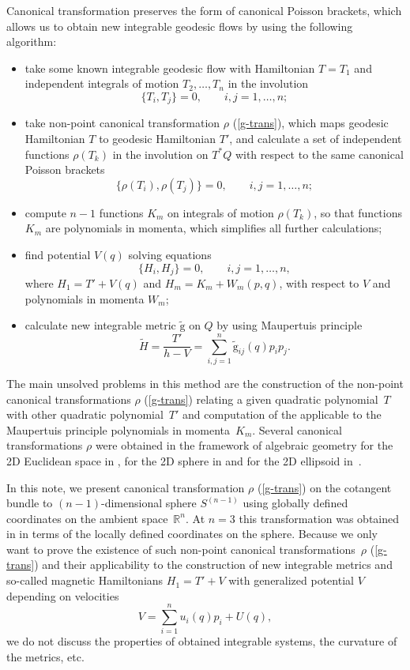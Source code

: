\documentclass[pdftex]{sigma}
\numberwithin{equation}{section}
\begin{document}
Canonical transformation preserves the form of canonical Poisson brackets, which allows us to obtain new integrable geodesic flows by using the following algorithm:
\begin{itemize}\itemsep=0pt
 \item take some known integrable geodesic flow with Hamiltonian $T=T_1$ and independent integrals of motion $T_2,\dots,T_n$ in the involution
 \[\{T_i,T_j\}=0 ,\qquad i,j=1,\dots,n;\]
 \item take non-point canonical transformation $\rho$ (\ref{g-trans}), which maps geodesic Hamiltonian $T$ to geodesic Hamiltonian $T'$, and calculate a set of independent functions $\rho(T_k)$ in the involution on $T^*Q$ with respect to the same canonical Poisson brackets
 \[\{\rho(T_i),\rho(T_j)\}=0 ,\qquad i,j=1,\dots,n ;\]
 \item compute $n-1$ functions $K_m$ on integrals of motion $\rho(T_k)$, so that functions $K_m$ are polynomials in momenta, which simplifies all further calculations;
 \item find potential $V(q)$ solving equations
 \[\{H_i,H_j\}=0 ,\qquad i,j=1,\dots,n,\]
 where $H_1=T'+V(q)$ and $H_m=K_m+W_m(p,q)$, with respect to $V$ and polynomials in momenta $W_m$;
 \item calculate new integrable metric $\tilde{\mathrm g}$ on $Q$ by using Maupertuis principle
 \begin{equation}\label{mau-metr}
 \tilde{H}=\frac{T'}{h-V}=\sum_{i,j=1}^n \tilde{\mathrm g}_{ij}(q) p_ip_j .
 \end{equation}
\end{itemize}
The main unsolved problems in this method are the construction of the non-point canonical transformations $\rho$ (\ref{g-trans}) relating a given quadratic polynomial~$T$ with other quadratic polynomial~$T'$ and computation of the applicable to the Maupertuis principle polynomials in momenta~$K_m$.
Several canonical transformations $\rho$ were obtained in the framework of algebraic geometry for the 2D Euclidean space in \cite{ts15b,ts17,ts18d,ts18g}, for the 2D sphere in \cite{ts15,ts15a,ts17v,ts17c} and for the 2D ellipsoid in~\cite{ts17ell}.

In this note, we present canonical transformation $\rho$ (\ref{g-trans}) on the cotangent bundle to $(n-1)$-dimensional sphere $S^{(n-1)}$ using globally defined coordinates on the ambient space~${\mathbb R}^n$. At $n=3$ this transformation was obtained in \cite{ts17v,ts17c} in terms of the locally defined coordinates on the sphere.
Because we only want to prove the existence of such non-point canonical transformations~$\rho$ (\ref{g-trans}) and their applicability to the construction of new integrable metrics and so-called magnetic Hamiltonians $H_1=T'+V$ with generalized potential $V$ depending on velocities
\[V=\sum_{i=1}^n u_i(q)p_i+U(q) ,\]
we do not discuss the properties of obtained integrable systems, the curvature of the metrics, etc.
\end{document}
